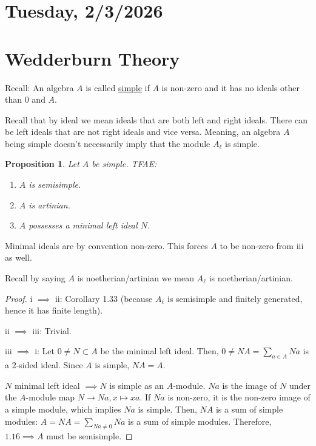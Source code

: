 \documentclass{article}
\theoremstyle{definition}
\theoremstyle{plain}
\newtheorem{proposition}[theorem]{Proposition}
\theoremstyle{remark}
\begin{document}
    \section*{Tuesday, 2/3/2026}
    
    \section{Wedderburn Theory}

    Recall: An algebra \(A\) is called \underline{simple} if \(A\) is non-zero and it has no ideals other than \(0\) and \(A\).

    Recall that by ideal we mean ideals that are both left and right ideals. There can be left ideals that are not right ideals and vice versa. Meaning, an algebra \(A\) being simple doesn't necessarily imply that the module \(A_\ell\) is simple.

    \begin{proposition}
        Let \(A\) be simple. TFAE:

        \begin{enumerate}[label=\roman*)]
            \item \(A\) is semisimple.
            \item \(A\) is artinian.
            \item \(A\) possesses a minimal left ideal \(N\). 
        \end{enumerate} 
    \end{proposition}

    Minimal ideals are by convention non-zero. This forces \(A\) to be non-zero from iii as well.

    Recall by saying \(A\) is noetherian/artinian we mean \(A_\ell\) is noetherian/artinian.

    \begin{proof}
        i \(\implies\) ii: Corollary 1.33 (because \(A_\ell\) is semisimple and finitely generated, hence it has finite length).

        ii \(\implies\) iii: Trivial.

        iii \(\implies\) i: Let \(0 \neq N \subset A\) be the minimal left ideal. Then, \(0 \neq NA = \sum_{a\in A} Na\) is a \(2\)-sided ideal. Since \(A\) is simple, \(NA = A\).

        \(N\) minimal left ideal \(\implies N\) is simple as an \(A\)-module. \(Na\) is the image of \(N\) under the \(A\)-module map \(N \to Na, x \mapsto xa\). If \(Na\) is non-zero, it is the non-zero image of a simple module, which implies \(Na\) is simple. Then, \(NA\) is a sum of simple modules: \(A = NA = \sum_{Na\neq 0} Na\) is a sum of simple modules. Therefore, \(1.16 \implies A\) must be semisimple.
    \end{proof}
\end{document}
